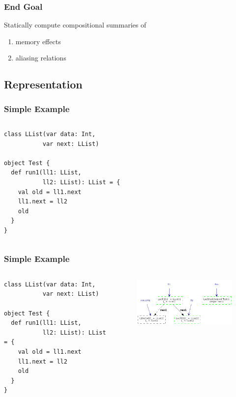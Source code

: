 \documentclass[hyperref={pdfpagelabels=false}]{beamer}
\begin{document}
\begin{frame}
\frametitle{End Goal}
    Statically compute compositional summaries of
    \begin{enumerate}
        \item memory effects
        \item aliasing relations
    \end{enumerate}
\end{frame}

\subsection{Representation}

\begin{frame}[fragile]
\frametitle{Simple Example}
  \begin{columns}
    \begin{column}{0.4\textwidth}
\begin{lstlisting}
class LList(var data: Int,
           var next: LList)

object Test {
  def run1(ll1: LList,
           ll2: LList): LList = {
    val old = ll1.next
    ll1.next = ll2
    old
  }
}
\end{lstlisting}
    \end{column}
    \begin{column}{0.6\textwidth}
      \begin{figure}[t]
      \end{figure}
    \end{column}
  \end{columns}
\end{frame}

\begin{frame}[fragile]
\frametitle{Simple Example}
  \begin{columns}
    \begin{column}{0.4\textwidth}
\begin{lstlisting}
class LList(var data: Int,
           var next: LList)

object Test {
  def run1(ll1: LList,
           ll2: LList): LList = {
    val old = ll1.next
    ll1.next = ll2
    old
  }
}
\end{lstlisting}
    \end{column}
    \begin{column}{0.6\textwidth}
      \begin{figure}[t]
        \includegraphics[width=60mm]{images/e1.png}\\
      \end{figure}
    \end{column}
  \end{columns}
\end{frame}
\end{document}
